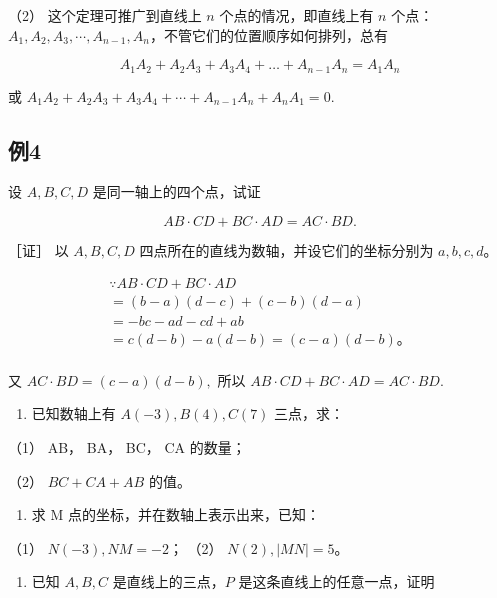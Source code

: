 （2） 这个定理可推广到直线上 \(n\) 个点的情况，即直线上有 \(n\)
个点：\(A_{1}, A_{2}, A_{3}, \cdots, A_{n-1}, A_{n}\)，不管它们的位置顺序如何排列，总有

\[
A_{1} A_{2} + A_{2} A_{3} + A_{3} A_{4} + \dots + A_{n - 1} A_{n} = A_{1} A_{n}
\]

或
\(A_{1}A_{2}+A_{2}A_{3}+A_{3}A_{4}+\cdots+A_{n-1}A_{n}+A_{n}A_{1}=0.\)

\subsection{例4}\label{ux4f8b4}

设 \(A, B, C, D\) 是同一轴上的四个点，试证

\[
AB \cdot CD + BC \cdot AD = AC \cdot BD.
\]

［证］ 以 \(A, B, C, D\) 四点所在的直线为数轴，并设它们的坐标分别为
\(a, b, c, d\)。

\[
\begin{array}{l} \because AB \cdot CD + BC \cdot AD \\ = (b - a) (d - c) + (c - b) (d - a) \\ = - b c - a d - c d + a b \\ = c (d - b) - a (d - b) = (c - a) (d - b)\text{。} \\ \end{array}
\]

又 \(AC\cdot BD = (c - a)(d - b),\) 所以
\(AB\cdot CD + BC\cdot AD = AC\cdot BD.\)

\begin{enumerate}
\def\labelenumi{\arabic{enumi}.}
\tightlist
\item
  已知数轴上有 \(A(-3), B(4), C(7)\) 三点，求：
\end{enumerate}

（1） AB， BA， BC， CA 的数量；

（2） \(BC + CA + AB\) 的值。

\begin{enumerate}
\def\labelenumi{\arabic{enumi}.}
\setcounter{enumi}{1}
\tightlist
\item
  求 M 点的坐标，并在数轴上表示出来，已知：
\end{enumerate}

（1） \(N(-3), NM = -2\)； （2） \(N(2), |MN| = 5\)。

\begin{enumerate}
\def\labelenumi{\arabic{enumi}.}
\setcounter{enumi}{2}
\tightlist
\item
  已知 \(A, B, C\) 是直线上的三点，\(P\) 是这条直线上的任意一点，证明
\end{enumerate}

